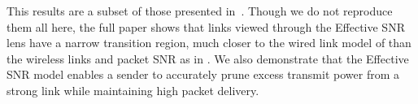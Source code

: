  This results are a subset of those presented in~\cite{Halperin_ESNR}. Though we do not reproduce them all here, the full paper shows that links viewed through the Effective SNR lens have a narrow transition region, much closer to the wired link model of  than the wireless links and packet SNR as in . We also demonstrate that the Effective SNR model enables a sender to accurately prune excess transmit power from a strong link while maintaining high packet delivery.

\ifx\mainfile\undefined

\fi
